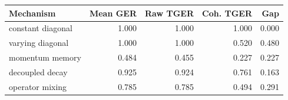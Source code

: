 \begin{tabular}{lrrrr}
\toprule
Mechanism & Mean GER & Raw TGER & Coh. TGER & Gap \\
\midrule
constant diagonal & 1.000 & 1.000 & 1.000 & 0.000 \\
varying diagonal & 1.000 & 1.000 & 0.520 & 0.480 \\
momentum memory & 0.484 & 0.455 & 0.227 & 0.227 \\
decoupled decay & 0.925 & 0.924 & 0.761 & 0.163 \\
operator mixing & 0.785 & 0.785 & 0.494 & 0.291 \\
\bottomrule
\end{tabular}
